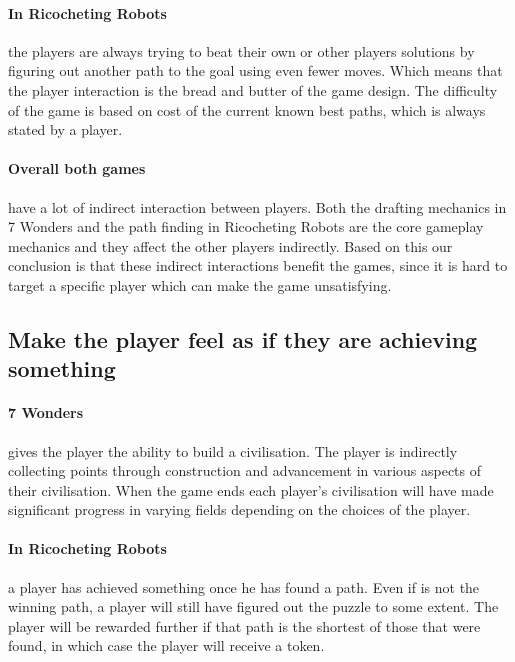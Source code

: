 \documentclass[a4paper]{article}
\begin{document}
\paragraph{In Ricocheting Robots} the players are always trying to beat their own or other players solutions by figuring out another path to the goal using even fewer moves. 
Which means that the player interaction is the bread and butter of the game design. 
The difficulty of the game is based on cost of the current known best paths, which is always stated by a player. 

\paragraph{Overall both games} have a lot of indirect interaction between players. Both the drafting mechanics in 7 Wonders and the path finding in Ricocheting Robots are the core gameplay mechanics and they affect the other players indirectly. Based on this our conclusion is that these indirect interactions benefit the games, since it is hard to target a specific player which can make the game unsatisfying.

\subsection{Make the player feel as if they are achieving something}
\paragraph{7 Wonders} gives the player the ability to build a civilisation. The player is indirectly collecting points through construction and advancement in various aspects of their civilisation. When the game ends each player's civilisation will have made significant progress in varying fields depending on the choices of the player.

\paragraph{In Ricocheting Robots} a player has achieved something once he has found a path. 
Even if is not the winning path, a player will still have figured out the puzzle to some extent.
The player will be rewarded further if that path is the shortest of those that were found, in which case the player will receive a token.
\end{document}
